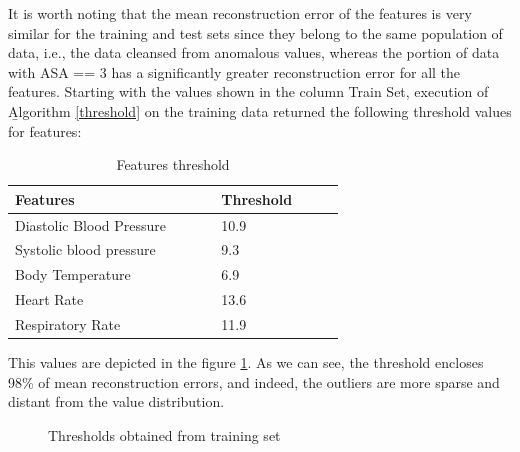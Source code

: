 \documentclass{article}
\begin{document}
\begin{multicols*}{2}
It is worth noting that the mean reconstruction error of the features is very similar for the training and test sets since they belong to the same population of data, i.e., the data cleansed from anomalous values, whereas the portion of data with ASA == 3 has a significantly greater reconstruction error for all the features.
Starting with the values shown in the column Train Set, execution of \b{Algorithm \ref{threshold}} on the training data returned the following threshold values for features:

\begin{table}[H]
	\centering
	\begin{tabular}{    p{0.5\linewidth} | p{0.3\linewidth} } 
		
		Features & Threshold \\ [0.5ex] 
		\hline
		Diastolic Blood Pressure & 10.9 \\
		Systolic blood pressure & 9.3 \\
		Body Temperature & 6.9 \\
		Heart Rate & 13.6 \\
		Respiratory Rate & 11.9 \\
	\end{tabular}
	\caption{Features threshold}
	\label{table:thresholds}
\end{table}

This values are depicted in the figure \ref{fig:thresholds}. As we can see, the threshold encloses 98\% of mean reconstruction errors, and indeed, the outliers are more sparse and distant from the value distribution.

\begin{figure}[H]
	\centering
	\caption{Thresholds obtained from training set}
	\label{fig:thresholds}
\end{figure}


\end{multicols*}
\end{document}
